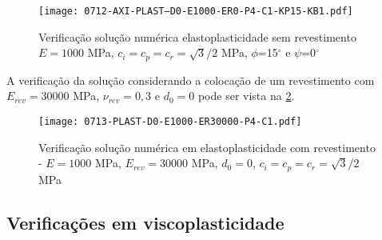 \begin{figure}[H]
	\begin{center}
		\texttt{[image: 0712-AXI-PLAST--D0-E1000-ER0-P4-C1-KP15-KB1.pdf]}
	\end{center}
	\caption{\label{PLAST-D0-E1000-ER0-P4-C1-KP15-KB1}Verificação solução numérica elastoplasticidade sem revestimento $E = 1000$ MPa, $c_i=c_p=c_r = \sqrt{3}/2$ MPa, $\phi$=15$^\circ$ e $\psi$=0$^\circ$}
\end{figure}

A verificação da solução considerando a colocação de um revestimento com $E_{rev} = 30000$ MPa, $\nu_{rev} = 0,3$ e $d_0=0$ pode ser vista na \ref{PLAST-D0-E1000-ER30000-P4-C1}.

\begin{figure}[H]
	\begin{center}
		\texttt{[image: 0713-PLAST-D0-E1000-ER30000-P4-C1.pdf]}
	\end{center}
	\caption{\label{PLAST-D0-E1000-ER30000-P4-C1}Verificação solução numérica em elastoplasticidade com revestimento - $E = 1000$ MPa, $E_{rev} = 30000$ MPa, $d_0=0$, $c_i=c_p=c_r=\sqrt{3}/2$ MPa}
\end{figure}

\subsection{Verificações em viscoplasticidade}

